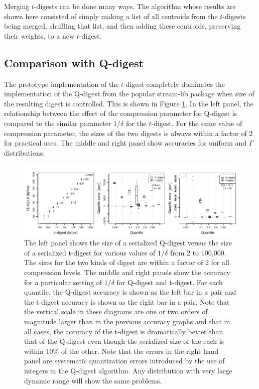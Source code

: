 \documentclass[11pt]{amsart}
\begin{document}
Merging $t$-digests can be done many ways.  The algorithm whose results are shown here consisted of simply making a list of all centroids from the $t$-digests being merged, shuffling that list, and then adding these centroids, preserving their weights, to a new $t$-digest.

\subsection{Comparison with Q-digest}
The prototype implementation of the $t$-digest completely dominates the implementation of the Q-digest from the popular stream-lib package \cite{github:stream} when size of the resulting digest is controlled.  This is shown in Figure \ref{fig:qd-comparison}.  In the left panel, the relationship between the effect of the compression parameter for Q-digest is compared to the similar parameter $1/\delta$ for the $t$-digest.  For the same value of compression parameter, the sizes of the two digests is always within a factor of 2 for practical uses.  The middle and right panel show accuracies for uniform and $\Gamma$ distributions.  
\begin{figure}[htb] %
   \centering
   \includegraphics[width=6in]{qd-sizes.pdf} 
   \caption{The left panel shows the size of a serialized Q-digest versus the size of a serialized t-digest for various values of $1/\delta$ from 2 to 100,000.  The sizes for the two kinds of digest are within a factor of 2 for all compression levels.  The middle and right panels show the accuracy for a particular setting of $1/\delta$ for Q-digest and t-digest.  For each quantile, the Q-digest accuracy is shown as the left bar in a pair and the t-digest accuracy is shown as the right bar in a pair.  Note that the vertical scale in these diagrams are one or two orders of magnitude larger than in the previous accuracy graphs and that in all cases, the accuracy of the t-digest is dramatically better than that of the Q-digest even though the serialized size of the each is within 10\% of the other.   Note that the errors in the right hand panel are systematic quantization errors introduced by the use of integers in the Q-digest algorithm.  Any distribution with very large dynamic range will show the same problems.}
   \label{fig:qd-comparison}
\end{figure}
\end{document}
